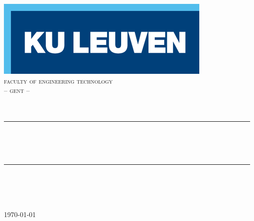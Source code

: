 \documentclass[11pt,a4paper,twoside]{article} %
\begin{document}

\begin{titlepage}																			
	\newcommand{\HRule}{\rule{\linewidth}{0.5mm}} %
	\center{} %

	\includegraphics[scale=0.55]{logo_kuleuven.png}\\
	\textsc{\large faculty of engineering technology\\-- gent --}\\[2cm]

	\textsc{\LARGE \MakeUppercase{\mycourse}}\\[0.25cm] %
	\textsc{\Large \MakeLowercase{\mysubtitle}}\\[0.25cm] %

	\HRule \\[0.7cm] %
	{ \huge \bfseries \mytitle \\[0.4cm] \MakeUppercase{\mysecondtitle}} \\[0.4cm] %
	\HRule \\[1.4cm] %
	
	{ \Large \MakeUppercase \mygroup } \\[0.4cm]
	
	\Large \myauthor \\[0.4cm] %
	\large \myclass
	\\[1.4cm]

	{\Large \today }\\[1.4cm] %



\end{titlepage}
\end{document}
